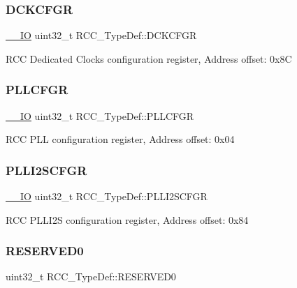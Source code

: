 \subsubsection{\texorpdfstring{D\+C\+K\+C\+F\+GR}{DCKCFGR}}
{\footnotesize\ttfamily \hyperlink{core__sc300_8h_aec43007d9998a0a0e01faede4133d6be}{\+\_\+\+\_\+\+IO} uint32\+\_\+t R\+C\+C\+\_\+\+Type\+Def\+::\+D\+C\+K\+C\+F\+GR}

R\+CC Dedicated Clocks configuration register, Address offset\+: 0x8C \mbox{\label{struct_r_c_c___type_def_a2a7ccb4e23cb05a574f243f6278b7b26}} 
\subsubsection{\texorpdfstring{P\+L\+L\+C\+F\+GR}{PLLCFGR}}
{\footnotesize\ttfamily \hyperlink{core__sc300_8h_aec43007d9998a0a0e01faede4133d6be}{\+\_\+\+\_\+\+IO} uint32\+\_\+t R\+C\+C\+\_\+\+Type\+Def\+::\+P\+L\+L\+C\+F\+GR}

R\+CC P\+LL configuration register, Address offset\+: 0x04 \mbox{\label{struct_r_c_c___type_def_ac3beb02dccd9131d6ce55bb29c5fa69f}} 
\subsubsection{\texorpdfstring{P\+L\+L\+I2\+S\+C\+F\+GR}{PLLI2SCFGR}}
{\footnotesize\ttfamily \hyperlink{core__sc300_8h_aec43007d9998a0a0e01faede4133d6be}{\+\_\+\+\_\+\+IO} uint32\+\_\+t R\+C\+C\+\_\+\+Type\+Def\+::\+P\+L\+L\+I2\+S\+C\+F\+GR}

R\+CC P\+L\+L\+I2S configuration register, Address offset\+: 0x84 \mbox{\label{struct_r_c_c___type_def_a646631532167f3386763a2d10a881a04}} 
\subsubsection{\texorpdfstring{R\+E\+S\+E\+R\+V\+E\+D0}{RESERVED0}}
{\footnotesize\ttfamily uint32\+\_\+t R\+C\+C\+\_\+\+Type\+Def\+::\+R\+E\+S\+E\+R\+V\+E\+D0}

